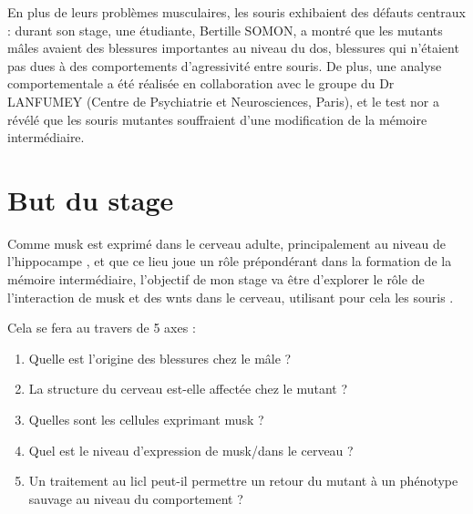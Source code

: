 	En plus de leurs problèmes musculaires, les souris \mcrd exhibaient des défauts centraux : durant son stage, une étudiante, Bertille SOMON, a montré que les mutants mâles avaient des blessures importantes au niveau du dos, blessures qui n'étaient pas dues à des comportements d'agressivité entre souris. De plus, une analyse comportementale a été réalisée en collaboration avec le groupe du Dr LANFUMEY (Centre de Psychiatrie et Neurosciences, Paris), et le test \gls{nor} a révélé que les souris mutantes souffraient d'une modification de la mémoire intermédiaire.
	
\section{But du stage}
\label{sec:IntroBut}

Comme \gls{musk} est exprimé dans le cerveau adulte, principalement au niveau de l'hippocampe \cite{Garcia-Osta2006}, et que ce lieu joue un rôle prépondérant dans la formation de la mémoire intermédiaire, l'objectif de mon stage va être d'explorer le rôle de l'interaction de \gls{musk} et des \Glspl{wnt} dans le cerveau, utilisant pour cela les souris \mcrd.

Cela se fera au travers de 5 axes : 
\begin{enumerate}
	\item Quelle est l'origine des blessures chez le mâle ?
	\item La structure du cerveau est-elle affectée chez le mutant ?
	\item Quelles sont les cellules exprimant \gls{musk} ?
	\item Quel est le niveau d'expression de \gls{musk}/\mcrd dans le cerveau ?
	\item Un traitement au \gls{licl} peut-il permettre un retour du mutant à un phénotype sauvage au niveau du comportement ?
\end{enumerate}
